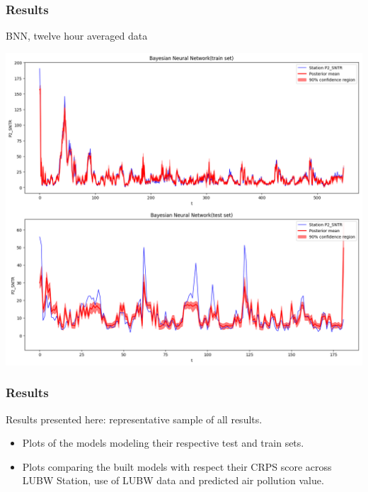 \documentclass[18pt]{beamer}
\begin{document}
\begin{frame}[t]
  \frametitle{Results}
  BNN, twelve hour averaged data
  \begin{center}
    \includegraphics[scale=0.25]{images/12h/bnn_12h}
  \end{center}
\end{frame}

\begin{frame}[t]
  \frametitle{Results}
  Results presented here: representative sample of all results.
  \begin{itemize}
  \item Plots of the models modeling their respective test and train sets.
    \pause
  \item Plots comparing the built models with respect their CRPS score across LUBW Station, use of LUBW data and predicted air pollution value.
  \end{itemize}
\end{frame}
\end{document}
